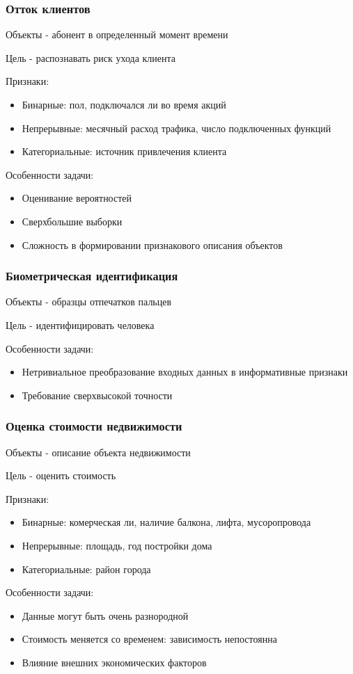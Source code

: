 \documentclass{beamer}
\begin{document}
	
	\begin{frame}
		\frametitle{Отток клиентов}
		Объекты - абонент в определенный момент времени
		
		Цель - распознавать риск ухода клиента
		
		Признаки:
		\begin{itemize}
			\item Бинарные: пол, подключался ли во время акций
			\item Непрерывные: месячный расход трафика, число подключенных функций
			\item Категориальные: источник привлечения клиента
		\end{itemize}
		
		Особенности задачи:
		\begin{itemize}
			\item Оценивание вероятностей
			\item Сверхбольшие выборки
			\item Сложность в формировании признакового описания объектов
		\end{itemize}
	\end{frame}
	
	
	\begin{frame}
		\frametitle{Биометрическая идентификация}
		Объекты - образцы отпечатков пальцев

		Цель - идентифицировать человека
				
		Особенности задачи:
		\begin{itemize}
			\item Нетривиальное преобразование входных данных в информативные признаки
			\item Требование сверхвысокой точности
		\end{itemize}			
	\end{frame}


	\begin{frame}
		\frametitle{Оценка стоимости недвижимости}
		Объекты - описание объекта недвижимости
		
		Цель - оценить стоимость
		
		Признаки:
		\begin{itemize}
			\item Бинарные: комерческая ли, наличие балкона, лифта, мусоропровода
			\item Непрерывные: площадь, год постройки дома
			\item Категориальные: район города
		\end{itemize}
		
		Особенности задачи:
		\begin{itemize}
			\item Данные могут быть очень разнородной
			\item Стоимость меняется со временем: зависимость непостоянна
			\item Влияние внешних экономических факторов
		\end{itemize}		
	\end{frame}
\end{document}
